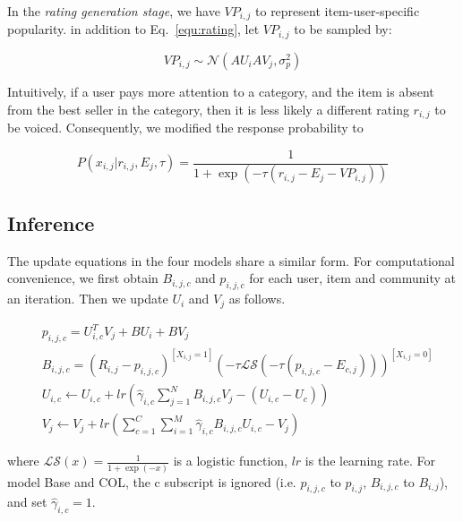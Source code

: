 \documentclass[sigconf]{acmart}
\newenvironment{shrinkeq}[1]
{ \bgroup
  \addtolength\abovedisplayshortskip{#1}
  \addtolength\abovedisplayskip{#1}
  \addtolength\belowdisplayshortskip{#1}
  \addtolength\belowdisplayskip{#1}}
{\egroup\ignorespacesafterend}
\begin{document}
In the \textit{rating generation stage}, we have $VP_{i,j}$ to represent item-user-specific popularity. in addition to Eq.~\ref{equ:rating}, let $VP_{i,j}$ to be sampled by:

\begin{equation}\label{equ:popularity}
VP_{i,j}\sim \mathcal{N}(AU_i AV_j,\sigma_p^2)
\end{equation}

Intuitively, if a user pays more attention to a category, and the item is absent from the best seller in the category, then it is less likely a different rating $r_{i,j}$ to be voiced.  Consequently, we modified the response probability to

\begin{equation}\label{equ:responseCPV}
P(x_{i,j}|r_{i,j},E_{j},\tau)=\frac{1}{1+\exp{(-\tau(r_{i,j}-E_{j}-VP_{i,j}))}}
\end{equation}



\subsection{Inference}

The update equations in the four models share a similar form. For computational convenience, we first obtain $B_{i,j,c}$ and $p_{i,j,c}$ for each user, item and community at an iteration. Then we update $U_i$ and $V_j$ as follows.

\begin{shrinkeq}{-2ex}
\begin{equation}\label{equ:update}
\begin{split}
&p_{i,j,c}=U_{i,c}^{T}V_{j} + BU_{i} + BV_{j} \\
&B_{i,j,c}=(R_{i,j}-p_{i,j,c})^{[X_{i,j}=1]}(-\tau \mathcal{LS}(-\tau(p_{i,j,c}-E_{c,j})))^{[X_{i,j}=0]} \\
&U_{i,c}\leftarrow U_{i,c}+lr(\hat{\gamma}_{i,c}\sum\limits_{j=1}^{N}B_{i,j,c}V_j-(U_{i,c}-U_c)) \\
&V_j\leftarrow V_j+lr(\sum\limits_{c=1}^{C}\sum\limits_{i=1}^{M}\hat{\gamma}_{i,c}B_{i,j,c}U_{i,c}-V_j)
\end{split}
\end{equation}
\end{shrinkeq}

where $\mathcal{LS}(x)=\frac{1}{1+\exp(-x)}$ is a logistic function, $lr$ is the learning rate. For model Base and COL, the c subscript is ignored (i.e. $p_{i,j,c}$ to $p_{i,j}$, $B_{i,j,c}$ to $B_{i,j}$), and set $\hat{\gamma}_{i,c}=1$.
\end{document}
